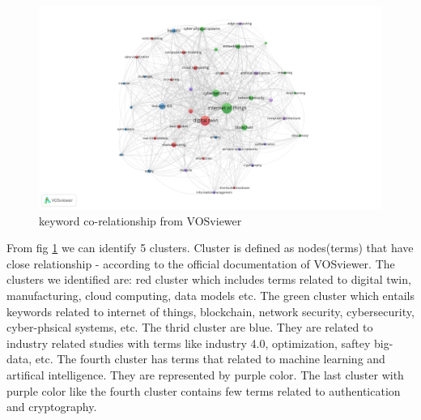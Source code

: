 \begin{figure}[h]
    \includegraphics[width=1.5\textwidth, center]{images/vos_key_cooc_6_final.png}
    \caption{keyword co-relationship from VOSviewer}
    \label{fig:co-occurrence-vosv}
\end{figure}

From fig \ref{fig:co-occurrence-vosv} we can identify 5 clusters. Cluster is defined as nodes(terms) that have close relationship - according to the official documentation of VOSviewer. The clusters we identified are: red cluster which includes terms related to digital twin, manufacturing, cloud computing, data models etc. The green cluster which entails keywords related to internet of things, blockchain, network security, cybersecurity, cyber-phsical systems, etc. The thrid cluster are blue. They are related to industry related studies with terms like industry 4.0, optimization, saftey big-data, etc. The fourth cluster has terms that related to machine learning and artifical intelligence. They are represented by purple color.  The last cluster with purple color like the fourth cluster contains few terms related to authentication and cryptography.   